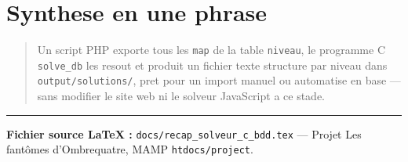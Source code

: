 \documentclass[11pt,a4paper]{article}
\begin{document}
\section{Synthese en une phrase}

\begin{quote}
Un script PHP exporte tous les \texttt{map} de la table \texttt{niveau}, le programme C \texttt{solve\_db} les resout et produit un fichier texte structure par niveau dans \texttt{output/solutions/}, pret pour un import manuel ou automatise en base --- sans modifier le site web ni le solveur JavaScript a ce stade.
\end{quote}

\vfill
\hrule
\small
\noindent
\textbf{Fichier source LaTeX :} \texttt{docs/recap\_solveur\_c\_bdd.tex} --- Projet Les fantômes d'Ombrequatre, MAMP \texttt{htdocs/project}.
\end{document}
